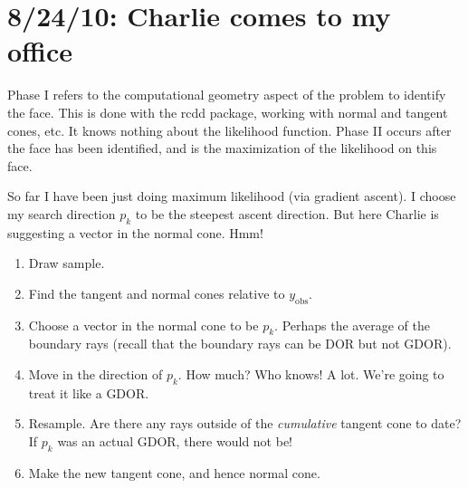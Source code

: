 \documentclass{amsbook}
\newcommand{\yobs}{y_{\textrm{obs}}}
\theoremstyle{definition}
\theoremstyle{remark}
\begin{document}
\section{8/24/10: Charlie comes to my office}
Phase I refers to the computational 
geometry aspect of the problem to identify the face.  This is done with the rcdd 
package, working with normal and tangent cones, etc.  It knows nothing about 
the likelihood function.  Phase II occurs after the face has been identified, and is 
the maximization of the likelihood on this face.

So far I have been just doing maximum likelihood (via gradient ascent).  I choose my 
search direction $p_k$ to be the steepest ascent direction.  But here Charlie is 
suggesting a vector in the normal cone.  Hmm!  
\begin{enumerate}
\item Draw sample.
\item Find the tangent and normal cones relative to $\yobs$.  
\item Choose a vector in the normal cone to be $p_k$.  Perhaps the average of the 
boundary rays (recall that the boundary rays can be DOR but not GDOR).
\item Move in the direction of $p_k$.  How much?  Who knows!  A lot.  We're going to 
treat it like a GDOR.
\item Resample.  Are there any rays outside of the \emph{cumulative} tangent cone to 
date?  If $p_k$ was an actual GDOR, there would not be!  
\item Make the new tangent cone, and hence normal cone.  
\end{enumerate}

\newpage
\end{document}
